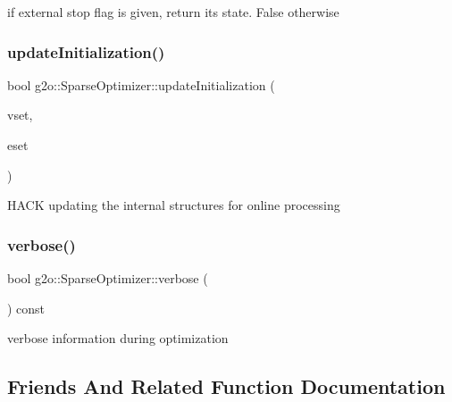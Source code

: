 if external stop flag is given, return its state. False otherwise 

\mbox{\label{classg2o_1_1_sparse_optimizer_ae971d068585055973798f93ac2363d94}} 
\subsubsection{\texorpdfstring{update\+Initialization()}{updateInitialization()}}
{\footnotesize\ttfamily bool g2o\+::\+Sparse\+Optimizer\+::update\+Initialization (\begin{DoxyParamCaption}\item[{\mbox{\hyperlink{classg2o_1_1_hyper_graph_a703938cdb4bb636860eed55a2489d70c}{Hyper\+Graph\+::\+Vertex\+Set}} \&}]{vset,  }\item[{\mbox{\hyperlink{classg2o_1_1_hyper_graph_a5e2970e236c0dcb4eff7c205d7b6b4ae}{Hyper\+Graph\+::\+Edge\+Set}} \&}]{eset }\end{DoxyParamCaption})\hspace{0.3cm}{\ttfamily [virtual]}}

H\+A\+CK updating the internal structures for online processing \mbox{\label{classg2o_1_1_sparse_optimizer_a8f0a83518efcba45f769b8b221885b54}} 
\subsubsection{\texorpdfstring{verbose()}{verbose()}}
{\footnotesize\ttfamily bool g2o\+::\+Sparse\+Optimizer\+::verbose (\begin{DoxyParamCaption}{ }\end{DoxyParamCaption}) const\hspace{0.3cm}{\ttfamily [inline]}}



verbose information during optimization 



\subsection{Friends And Related Function Documentation}
\mbox{\label{classg2o_1_1_sparse_optimizer_af974cb94744550cc732d61f7fd7d63ed}} 
